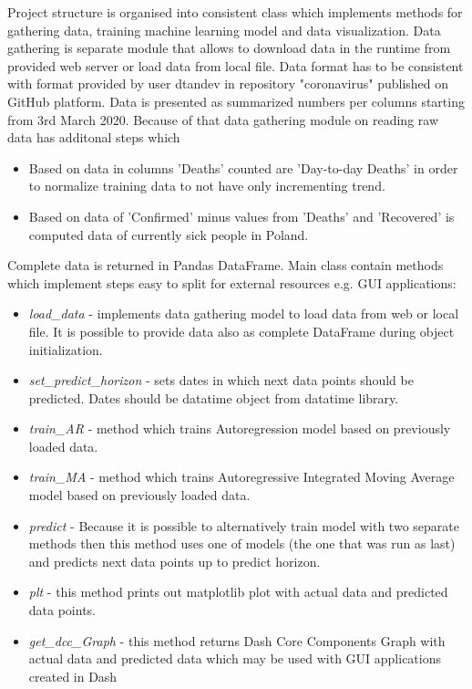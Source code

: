 \documentclass[conference]{IEEEtran}
\begin{document}
Project structure is organised into consistent class which implements methods for gathering data, training machine learning model and data visualization.
\newline
\newline
Data gathering is separate module that allows to download data in the runtime from provided web server or load data from local file.
Data format has to be consistent with format provided by user dtandev in repository "coronavirus" published on GitHub platform.
Data is presented as summarized numbers per columns starting from 3rd March 2020.
Because of that data gathering module on reading raw data has additonal steps which
\begin{itemize}
\item Based on data in columns 'Deaths' counted are 'Day-to-day Deaths' in order to normalize training data to not have only incrementing trend.
\item Based on data of 'Confirmed' minus values from 'Deaths' and 'Recovered' is computed data of currently sick people in Poland.
\end{itemize}
Complete data is returned in Pandas DataFrame.
\newline
\newline
Main class contain methods which implement steps easy to split for external resources e.g. GUI applications:
\begin{itemize}
\item \textit{load\_data} - implements data gathering model to load data from web or local file. It is possible to provide data also as complete DataFrame during object initialization.
\item \textit{set\_predict\_horizon} - sets dates in which next data points should be predicted. Dates should be datatime object from datatime library.
\item \textit{train\_AR} - method which trains Autoregression model based on previously loaded data.
\item \textit{train\_MA} - method which trains Autoregressive Integrated Moving Average model based on previously loaded data.
\item \textit{predict} - Because it is possible to alternatively train model with two separate methods then this method uses one of models (the one that was run as last) and predicts next data points up to predict horizon.
\item \textit{plt} - this method prints out matplotlib plot with actual data and predicted data points.
\item \textit{get\_dcc\_Graph} - this method returns Dash Core Components Graph with actual data and predicted data which may be used with GUI applications created in Dash
\end{itemize}
\end{document}
